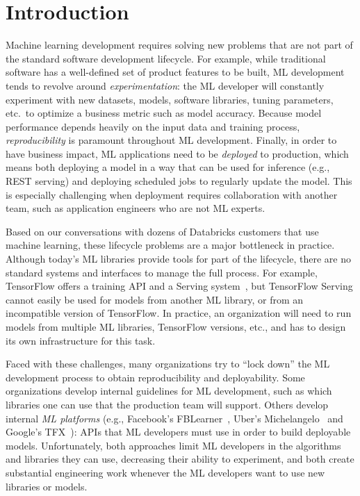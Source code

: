 \documentclass[11pt]{article}
\begin{document}
\section{Introduction}

Machine learning development requires solving new problems that are not part of the standard software development lifecycle.
For example, while traditional software has a well-defined set of product features to be built, ML development tends to revolve around \emph{experimentation}: the ML developer will constantly experiment with new datasets, models, software libraries, tuning parameters, etc.~to optimize a business metric such as model accuracy.
Because model performance depends heavily on the input data and training process, \emph{reproducibility} is paramount throughout ML development.
Finally, in order to have business impact, ML applications need to be \emph{deployed} to production, which means both deploying a model in a way that can be used for inference (e.g., REST serving) and deploying scheduled jobs to regularly update the model.
This is especially challenging when deployment requires collaboration with another team, such as application engineers who are not ML experts.

Based on our conversations with dozens of Databricks customers that use machine learning, these lifecycle problems are a major bottleneck in practice.
Although today's ML libraries provide tools for part of the lifecycle, there are no standard systems and interfaces to manage the full process.
For example, TensorFlow offers a training API and a Serving system~\cite{tfx}, but TensorFlow Serving cannot easily be used for models from another ML library, or from an incompatible version of TensorFlow.
In practice, an organization will need to run models from multiple ML libraries, TensorFlow versions, etc., and has to design its own infrastructure for this task.


Faced with these challenges, many organizations try to ``lock down'' the ML development process to obtain reproducibility and deployability.
Some organizations develop internal guidelines for ML development, such as which libraries one can use that the production team will support.
Others develop internal \emph{ML platforms} (e.g., Facebook's FBLearner~\cite{fblearner}, Uber's Michelangelo~\cite{michelangelo} and Google's TFX~\cite{tfx}): APIs that ML developers must use in order to build deployable models.
Unfortunately, both approaches limit ML developers in the algorithms and libraries they can use, decreasing their ability to experiment, and both create substantial engineering work whenever the ML developers want to use new libraries or models.
\end{document}

